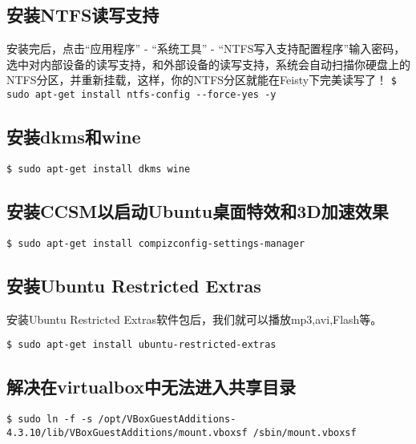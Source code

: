 \subsection{安装NTFS读写支持} 
安装完后，点击“应用程序” - “系统工具” - “NTFS写入支持配置程序”输入密码，选中对内部设备的读写支持，和外部设备的读写支持，系统会自动扫描你硬盘上的NTFS分区，并重新挂载，这样，你的NTFS分区就能在Feisty下完美读写了！
\verb"$ sudo apt-get install ntfs-config --force-yes -y"

\subsection{安装dkms和wine}
\verb"$ sudo apt-get install dkms wine"

\subsection{安装CCSM以启动Ubuntu桌面特效和3D加速效果}
\verb"$ sudo apt-get install compizconfig-settings-manager"

\subsection{安装Ubuntu Restricted Extras}
安装Ubuntu Restricted Extras软件包后，我们就可以播放mp3,avi,Flash等。

\verb"$ sudo apt-get install ubuntu-restricted-extras"

\subsection {解决在virtualbox中无法进入共享目录}
\verb"$ sudo ln -f -s /opt/VBoxGuestAdditions-4.3.10/lib/VBoxGuestAdditions/mount.vboxsf /sbin/mount.vboxsf"

